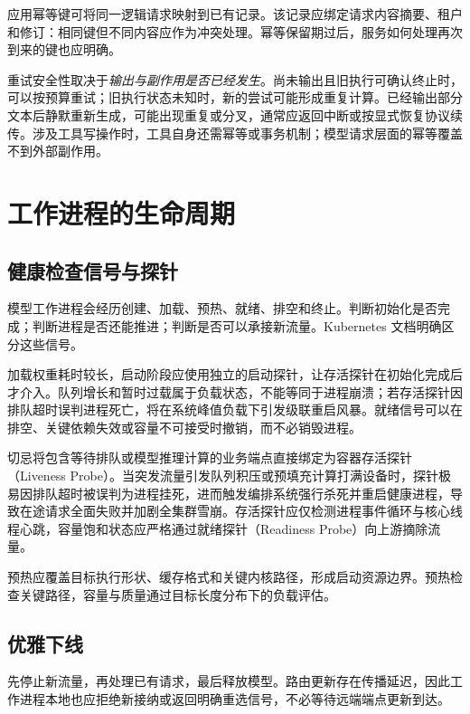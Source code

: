 \documentclass[../textbook.tex]{subfiles}
\begin{document}
应用幂等键可将同一逻辑请求映射到已有记录。该记录应绑定请求内容摘要、租户和修订：相同键但不同内容应作为冲突处理。幂等保留期过后，服务如何处理再次到来的键也应明确。

重试安全性取决于\emph{输出与副作用是否已经发生}。尚未输出且旧执行可确认终止时，可以按预算重试；旧执行状态未知时，新的尝试可能形成重复计算。已经输出部分文本后静默重新生成，可能出现重复或分叉，通常应返回中断或按显式恢复协议续传。涉及工具写操作时，工具自身还需幂等或事务机制；模型请求层面的幂等覆盖不到外部副作用。

\section{工作进程的生命周期}

\subsection{健康检查信号与探针}
模型工作进程会经历创建、加载、预热、就绪、排空和终止。判断初始化是否完成；判断进程是否还能推进；判断是否可以承接新流量。Kubernetes 文档明确区分这些信号\cite{kubernetes2026probes}。

加载权重耗时较长，启动阶段应使用独立的启动探针，让存活探针在初始化完成后才介入。队列增长和暂时过载属于负载状态，不能等同于进程崩溃；若存活探针因排队超时误判进程死亡，将在系统峰值负载下引发级联重启风暴。就绪信号可以在排空、关键依赖失效或容量不可接受时撤销，而不必销毁进程。

\begin{warning}[存活探针与队列排队的级联雪崩]
切忌将包含等待排队或模型推理计算的业务端点直接绑定为容器存活探针（Liveness Probe）。当突发流量引发队列积压或预填充计算打满设备时，探针极易因排队超时被误判为进程挂死，进而触发编排系统强行杀死并重启健康进程，导致在途请求全面失败并加剧全集群雪崩。存活探针应仅检测进程事件循环与核心线程心跳，容量饱和状态应严格通过就绪探针（Readiness Probe）向上游摘除流量。
\end{warning}

预热应覆盖目标执行形状、缓存格式和关键内核路径，形成启动资源边界。预热检查关键路径，容量与质量通过目标长度分布下的负载评估。

\subsection{优雅下线}
先停止新流量，再处理已有请求，最后释放模型。路由更新存在传播延迟，因此工作进程本地也应拒绝新接纳或返回明确重选信号，不必等待远端端点更新到达。
\end{document}
